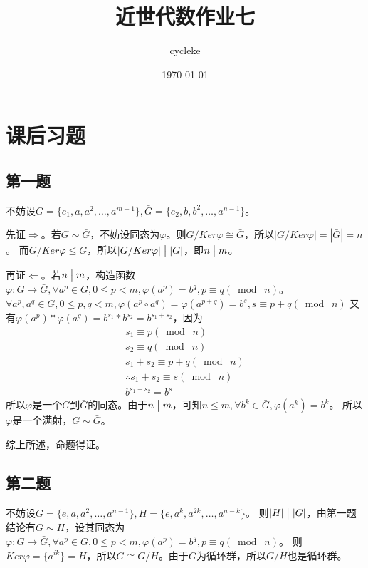 \documentclass[12pt,onecolumn]{article}
\title{近世代数作业七}
\author{cycleke}
\date{\today}
\theoremstyle{plain}
\begin{document}
\maketitle
\tableofcontents
\clearpage

\section{课后习题}

\subsection{第一题}
\begin{proof*}
  不妨设$G = \{e_1, a, a^2, \ldots, a^{m - 1}\}, \bar{G} = \{e_2, b, b^2, \ldots, a^{n - 1}\}$。

  先证$\Rightarrow$。若$G \sim \bar{G}$，不妨设同态为$\varphi$。则$G/Ker\varphi \cong \bar{G}$，所以$|G/Ker\varphi| = |\bar{G}| = n$。
  而$ G/Ker\varphi \leq G$，所以$|G/Ker\varphi| \bigm| |G|$，即$n \bigm| m$。

  再证$\Leftarrow$。若$n \bigm| m$，构造函数$\varphi:G \to \bar{G}, \forall a^p \in G, 0 \leq p < m, \varphi(a^p) = b^{q}, p \equiv q(\bmod\;n)$。
  $\forall a^p, a^q \in G, 0 \leq p, q < m, \varphi(a^p \circ a^q) = \varphi(a^{p + q}) = b^s, s \equiv p + q (\bmod\;n)$
  又有$ \varphi(a^p) * \varphi(a^q) = b^{s_1} * b^{s_2} = b^{s_1 + s_2}$，因为
  \begin{gather*}
    s_1 \equiv p (\bmod\;n) \\
    s_2 \equiv q (\bmod\;n) \\
    s_1 + s_2 \equiv p + q(\bmod\;n) \\
    \therefore s_1 + s_2 \equiv s(\bmod\;n) \\
    b^{s_1 + s_2} = b^s
  \end{gather*}
  所以$\varphi$是一个$G$到$\bar{G}$的同态。由于$n \bigm| m$，可知$n \leq m, \forall b^k \in \bar{G}, \varphi(a^k) = b^k$。
  所以$\varphi$是一个满射，$G \sim \bar{G}$。

  综上所述，命题得证。
\end{proof*}

\subsection{第二题}
\begin{proof*}
  不妨设$G = \{e, a, a^2, \ldots, a^{n - 1}\}, H = \{e, a^k, a^{2k}, \ldots, a^{n - k}\}$。
  则$|H| \bigm| |G|$，由第一题结论有$G \sim H$，设其同态为$\varphi:G \to \bar{G}, \forall a^p \in G, 0 \leq p < m, \varphi(a^p) = b^{q}, p \equiv q(\bmod\;n)$。
  则$Ker\varphi = \{a^{ik}\} = H$，所以$G \cong G / H$。由于$G$为循环群，所以$G / H$也是循环群。
\end{proof*}
\end{document}
